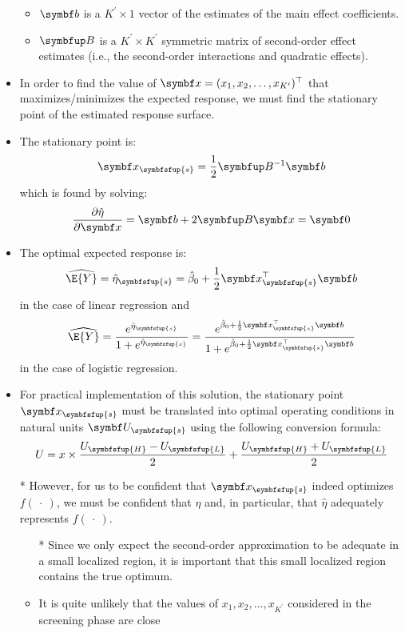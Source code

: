 \begin{itemize}
\begin{itemize}
              \item $ \Vector{b} $ is a $ K^\prime \times 1 $ vector of the estimates of the main effect coefficients.
              \item $ \Matrix{B} $ is a $ K^\prime \times K^\prime $ symmetric matrix of second-order effect estimates
                    (i.e., the second-order interactions and quadratic effects).
          \end{itemize}
    \item In order to find the value of $ \Vector{x}=(x_1,x_2,\ldots,x_{K^\prime})^\top $ that maximizes/minimizes the expected response,
          we must find the stationary point of the estimated response surface.
    \item The stationary point is:
          \[ \Vector{x}_{\symbfsfup{s}}=\frac{1}{2} \Matrix{B}^{-1}\Vector{b} \]
          which is found by solving:
          \[ \pdv{\hat{\eta}}{\Vector{x}}=\Vector{b}+2\Matrix{B}\Vector{x}=\Vector{0} \]
    \item The optimal expected response is:
          \[ \widehat{\E{Y}}=\hat{\eta}_{\symbfsfup{s}}=\hat{\beta}_0+\frac{1}{2} \Vector{x}^\top_{\symbfsfup{s}} \Vector{b} \]
          in the case of linear regression and
          \[ \widehat{\E{Y}}=\frac{e^{\hat{\eta}_{\symbfsfup{s}}}}{1+e^{\hat{\eta}_{\symbfsfup{s}}}}
              =\frac{e^{\hat{\beta}_0+\frac{1}{2} \Vector{x}^\top_{\symbfsfup{s}} \Vector{b}}}{1+e^{\hat{\beta}_0+\frac{1}{2} \Vector{x}^\top_{\symbfsfup{s}} \Vector{b}}} \]
          in the case of logistic regression.
    \item For practical implementation of this solution, the stationary point $ \Vector{x}_{\symbfsfup{s}} $ must be translated into optimal
          operating conditions in natural units $ \Vector{U}_{\symbfsfup{s}} $ using the following conversion formula:
          \[ U=x\times \frac{U_{\symbfsfup{H}}-U_{\symbfsfup{L}}}{2}+\frac{U_{\symbfsfup{H}}+U_{\symbfsfup{L}}}{2}  \]
    \item[*] However, for us to be confident that $ \Vector{x}_{\symbfsfup{s}} $ indeed optimizes $ f(\:\cdot\:) $, we must be confident that $ \eta $ and, in particular,
        that $ \hat{\eta} $ adequately represents $ f(\:\cdot\:) $.
        \begin{itemize}
            \item[*] Since we only expect the second-order approximation to be adequate in a small localized region,
                it is important that this small localized region contains the true optimum.
            \item It is quite unlikely that the values of $ x_1,x_2,\ldots,x_{K^\prime} $ considered in the screening phase are close

\end{itemize}
\end{itemize}
